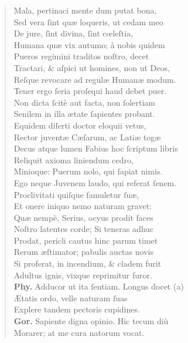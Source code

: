 \documentclass[a4paper,12pt]{article}
\begin{document}
\begin{verse}
Mala, pertinaci mente dum putat bona,\\[0pt]
Sed vera ſint quæ loqueris, ut cedam meo\\[0pt]
De jure, ſint divina, ſint cœleſtia,\\[0pt]
Humana quæ vix autumo; à nobis quidem\\[0pt]
Pueros regimini traditos noſtro, decet\\[0pt]
Tractari, \& aſpici ut homines, non ut Deos,\\[0pt]
Reſque revocare ad regulæ Humanæ modum.\\[0pt]
Tener ergo ſeria proſequi haud debet puer.\\[0pt]
Non dicta ſcitè aut facta, non ſolertiam\\[0pt]
Senilem in illa ætate ſapientes probant.\\[0pt]
Equidem diſerti doctor eloquii vetus,\\[0pt]
Rector juventæ Cæſarum, ac Latiæ togæ\\[0pt]
Decus atque lumen Fabius hoc ſcriptum libris\\[0pt]
Reliquit axioma liniendum cedro,\\[0pt]
Minioque: Puerum nolo, qui ſapiat nimis.\\[0pt]
Ego neque Juvenem laudo, qui referat ſenem.\\[0pt]
Proclivitati quiſque famuletur ſuæ,\\[0pt]
Et onere iniquo nemo naturam gravet:\\[0pt]
Quæ nempè, Serius, ocyus prodit faces\\[0pt]
Noſtro latentes corde; Si teneras adhuc\\[0pt]
Prodat, pericli cautus hinc parum timet\\[0pt]
Rerum æſtimator; pabulis auctas novis\\[0pt]
Si proferat, in incendium, \& cladem furit\\[0pt]
Adultus ignis, vixque reprimitur furor.\\[0pt]
\textbf{Phy.} Adducor ut ita ſentiam. Longus docet (a)\footnotemark\\[0pt]
Ætatis ordo, velle naturam ſuas\\[0pt]
Explere tandem pectoris cupidines.\\[0pt]
\textbf{Gor.} Sapiente digna opinio. Hic tecum diù\\[0pt]
Morarer; at me cura natorum vocat.\\[0pt]

\end{verse}
\end{document}
